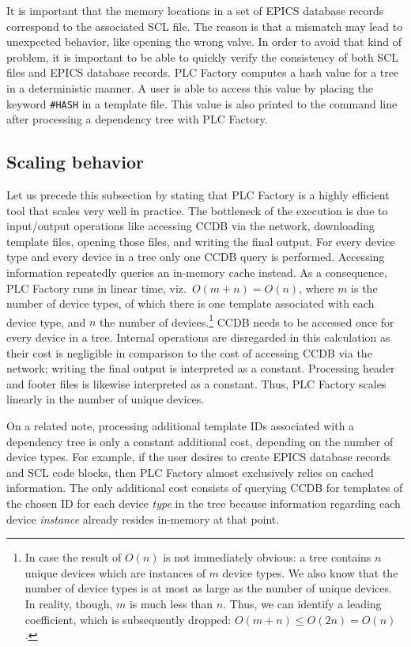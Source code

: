 \documentclass[a4paper,
              ]{jacow}
\begin{document}
It is important that the memory locations in a set of EPICS database records correspond to the associated SCL file. The reason is that a mismatch may lead to unexpected behavior, like opening the wrong valve. In order to avoid that kind of problem, it is important to be able to quickly verify the consistency of both SCL files and EPICS database records. PLC Factory computes a hash value for a tree in a deterministic manner. A user is able to access this value by placing the keyword \texttt{\#HASH} in a template file. This value is also printed to the command line after processing a dependency tree with PLC Factory.


\subsection{Scaling behavior}
\label{subsec:runtime}
Let us precede this subsection by stating that PLC Factory is a highly efficient tool that scales very well in practice. The bottleneck of the execution is due to input/output operations like accessing CCDB via the network, downloading template files, opening those files, and writing the final output. For every device type and every device in a tree only one CCDB query is performed. Accessing information repeatedly queries an in-memory cache instead. As a consequence, PLC Factory runs in linear time, viz.\ $O(m + n) = O(n)$, where $m$ is the number of device types, of which there is one template associated with each device type, and $n$ the number of devices.\footnote{In case the result of $O(n)$ is not immediately obvious: a tree contains $n$ unique devices which are instances of $m$ device types. We also know that the number of device types is at most as large as the number of unique devices. In reality, though, $m$ is much less than $n$. Thus, we can identify a leading coefficient, which is subsequently dropped: $O(m + n) \le O(2n) = O(n)$.} CCDB needs to be accessed once for every device in a tree. Internal operations are disregarded in this calculation as their cost is negligible in comparison to the cost of accessing CCDB via the network; writing the final output is interpreted as a constant. Processing header and footer files is likewise interpreted as a constant. Thus, PLC Factory scales linearly in the number of unique devices.

On a related note, processing additional template IDs associated with a dependency tree is only a constant additional cost, depending on the number of device types. For example, if the user desires to create EPICS database records and SCL code blocks, then PLC Factory almost exclusively relies on cached information. The only additional cost consists of querying CCDB for templates of the chosen ID for each device \emph{type} in the tree because information regarding each device \emph{instance} already resides in-memory at that point.
\end{document}
